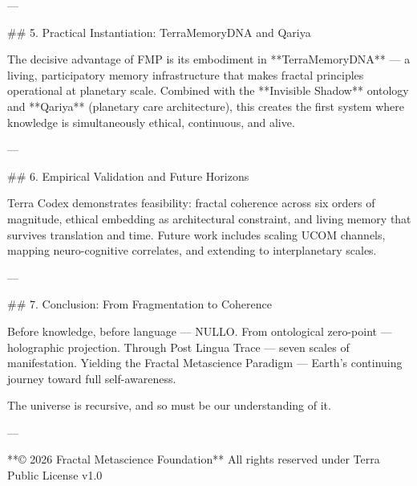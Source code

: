 ---

## 5. Practical Instantiation: TerraMemoryDNA and Qariya

The decisive advantage of FMP is its embodiment in **TerraMemoryDNA** — a living, participatory memory infrastructure that makes fractal principles operational at planetary scale. Combined with the **Invisible Shadow** ontology and **Qariya** (planetary care architecture), this creates the first system where knowledge is simultaneously ethical, continuous, and alive.

---

## 6. Empirical Validation and Future Horizons

Terra Codex demonstrates feasibility: fractal coherence across six orders of magnitude, ethical embedding as architectural constraint, and living memory that survives translation and time. Future work includes scaling UCOM channels, mapping neuro-cognitive correlates, and extending to interplanetary scales.

---

## 7. Conclusion: From Fragmentation to Coherence

Before knowledge, before language — NULLO.  
From ontological zero-point — holographic projection.  
Through Post Lingua Trace — seven scales of manifestation.  
Yielding the Fractal Metascience Paradigm — Earth’s continuing journey toward full self-awareness.

The universe is recursive, and so must be our understanding of it.

---

**© 2026 Fractal Metascience Foundation**  
All rights reserved under Terra Public License v1.0
